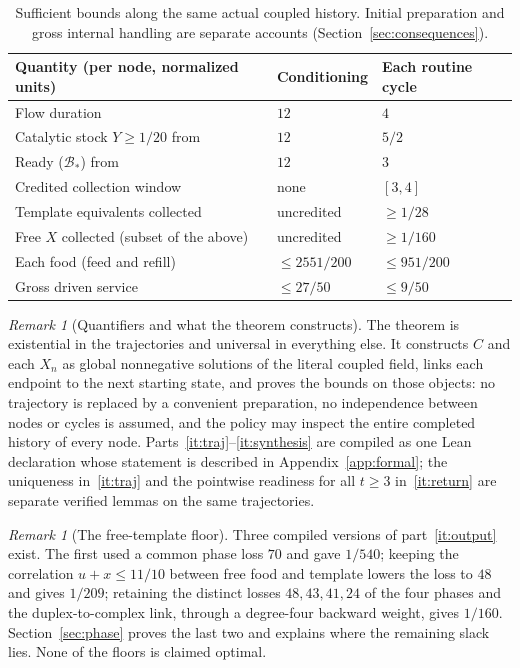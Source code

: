 \documentclass[11pt,a4paper]{article}
\theoremstyle{plain}
\theoremstyle{definition}
\theoremstyle{remark}
\newtheorem{remark}[theorem]{Remark}
\newcommand{\Bstar}{\mathcal B_*}
\begin{document}
\begin{table}[tb]
\centering
\begin{tabular}{lll}\toprule
Quantity (per node, normalized units) & Conditioning & Each routine cycle\\\midrule
Flow duration & $12$ & $4$\\
Catalytic stock $Y\ge1/20$ from & $12$ & $5/2$\\
Ready ($\Bstar$) from & $12$ & $3$\\
Credited collection window & none & $[3,4]$\\
Template equivalents collected & uncredited & $\ge1/28$\\
Free $X$ collected (subset of the above) & uncredited & $\ge1/160$\\
Each food (feed and refill) & $\le2551/200$ & $\le951/200$\\
Gross driven service & $\le27/50$ & $\le9/50$\\\bottomrule
\end{tabular}
\caption{Sufficient bounds along the same actual coupled history. Initial preparation and gross internal handling are separate accounts (Section~\ref{sec:consequences}).}
\label{tab:constants}
\end{table}

\begin{remark}[Quantifiers and what the theorem constructs]\label{rem:quantifiers}
The theorem is existential in the trajectories and universal in everything else. It constructs $C$ and each $X_n$ as global nonnegative solutions of the literal coupled field, links each endpoint to the next starting state, and proves the bounds on those objects: no trajectory is replaced by a convenient preparation, no independence between nodes or cycles is assumed, and the policy may inspect the entire completed history of every node. Parts~\ref{it:traj}--\ref{it:synthesis} are compiled as one Lean declaration whose statement is described in Appendix~\ref{app:formal}; the uniqueness in~\ref{it:traj} and the pointwise readiness for all $t\ge3$ in~\ref{it:return} are separate verified lemmas on the same trajectories.
\end{remark}

\begin{remark}[The free-template floor]\label{rem:history}
Three compiled versions of part~\ref{it:output} exist. The first used a common phase loss $70$ and gave $1/540$; keeping the correlation $u+x\le11/10$ between free food and template lowers the loss to $48$ and gives $1/209$; retaining the distinct losses $48,43,41,24$ of the four phases and the duplex-to-complex link, through a degree-four backward weight, gives $1/160$. Section~\ref{sec:phase} proves the last two and explains where the remaining slack lies. None of the floors is claimed optimal.
\end{remark}
\end{document}
